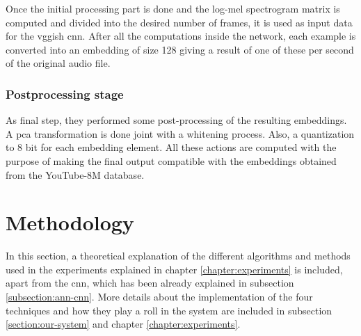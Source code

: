 	Once the initial processing part is done and the log-mel spectrogram matrix is computed and divided into the desired number of frames, it is used as input data for the \acrshort{vgg}ish \acrshort{cnn}. After all the computations inside the network, each example is converted into an embedding of size 128 giving a result of one of these per second of the original audio file.

\subsubsection*{Postprocessing stage}

	As final step, they performed some post-processing of the resulting embeddings. A \acrfull{pca} \cite{Abdi2010} transformation is done joint with a whitening process. Also, a quantization to 8 bit for each embedding element. All these actions are computed with the purpose of making the final output compatible with the embeddings obtained from the YouTube-8M database.
	
\section{Methodology}
\label{section:methodology}

	In this section, a theoretical explanation of the different algorithms and methods used in the experiments explained in chapter \ref{chapter:experiments} is included, apart from the \acrshort{cnn}, which has been already explained in subsection \ref{subsection:ann-cnn}. More details about the implementation of the four techniques and how they play a roll in the system are included in subsection \ref{section:our-system} and chapter \ref{chapter:experiments}.
	
	
	
	
	
	
	
	
	
